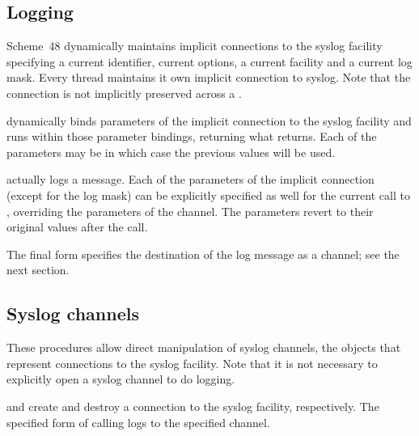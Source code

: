 \subsection*{Logging}

Scheme~48 dynamically maintains implicit connections to the syslog
facility specifying a current identifier, current options, a current
facility and a current log mask.  Every thread
maintains it own implicit connection to syslog.  Note that the
connection is not implicitly preserved across a .

\begin{protos}
\end{protos}
\noindent
{} dynamically binds parameters of the
implicit connection to the syslog facility and runs 
within those parameter bindings, returning what 
returns.  Each of the parameters may be  in which case the
previous values will be used.

\begin{protos}
\end{protos}
\noindent
{} actually logs a message.  Each of the parameters of the
implicit connection (except for the log mask) can be explicitly
specified as well for the current call to , overriding
the parameters of the channel.  The parameters revert to their
original values after the call.

The final form specifies the destination of the log message as a
channel; see the next section.

\subsection*{Syslog channels}
%
These procedures allow direct manipulation of syslog channels, the
objects that represent connections to the syslog facility.  Note that
it is not necessary to explicitly open a syslog channel to do logging.

\begin{protos}
\end{protos}
\noindent
{} and  create and
destroy a connection to the syslog facility, respectively.  The
specified form of calling  logs to the specified channel.

